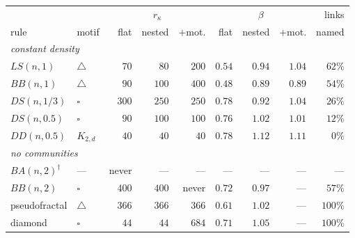 \begin{center}
\footnotesize\setlength{\tabcolsep}{3pt}
\begin{tabular}{llrrrrrrr}
\hline
 & & \multicolumn{3}{c}{$r_\kappa$} & \multicolumn{3}{c}{$\beta$} & links\\
rule & motif & flat & nested & $+$mot. & flat & nested & $+$mot. & named\\
\hline
\multicolumn{9}{l}{\emph{constant density}}\\
\quad $LS(n,1)$ & $\triangle$ & $70$ & $80$ & $200$ & $0.54$ & $0.94$ & $1.04$ & $62\%$\\
\quad $BB(n,1)$ & $\triangle$ & $90$ & $100$ & $400$ & $0.48$ & $0.89$ & $0.89$ & $54\%$\\
\quad $DS(n,1/3)$ & $\square$ & $300$ & $250$ & $250$ & $0.78$ & $0.92$ & $1.04$ & $26\%$\\
\quad $DS(n,0.5)$ & $\square$ & $90$ & $100$ & $100$ & $0.76$ & $1.02$ & $1.01$ & $12\%$\\
\quad $DD(n,0.5)$ & $K_{2,d}$ & $40$ & $40$ & $40$ & $0.78$ & $1.12$ & $1.11$ & $0\%$\\
\hline
\multicolumn{9}{l}{\emph{no communities}}\\
\quad $BA(n,2)^{\dagger}$ & --- & never & --- & --- & --- & --- & --- & ---\\
\quad $BB(n,2)$ & $\square$ & $400$ & $400$ & never & $0.72$ & $0.97$ & --- & $57\%$\\
\quad pseudofractal & $\triangle$ & $366$ & $366$ & $366$ & $0.61$ & $1.02$ & --- & $100\%$\\
\quad diamond & $\square$ & $44$ & $44$ & $684$ & $0.71$ & $1.05$ & --- & $100\%$\\
\hline
\end{tabular}
\end{center}
